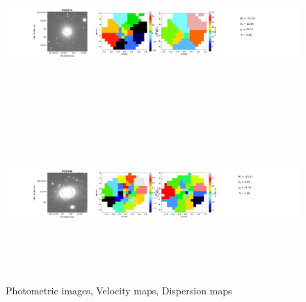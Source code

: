 \documentclass{aa}
\begin{document}
\begin{figure}[!htb]
   \includegraphics[width=21cm,height=6cm,keepaspectratio]{../2_pipeline/1_V&S_Maps/274Velocity_map.pdf}
   \includegraphics[width=21cm,height=6cm,keepaspectratio]{../2_pipeline/1_V&S_Maps/298Velocity_map.pdf}
         \caption{Photometric images, Velocity maps, Dispersion maps}
         \label{FigVelDis}
\end{figure}
\clearpage
%
\end{document}
